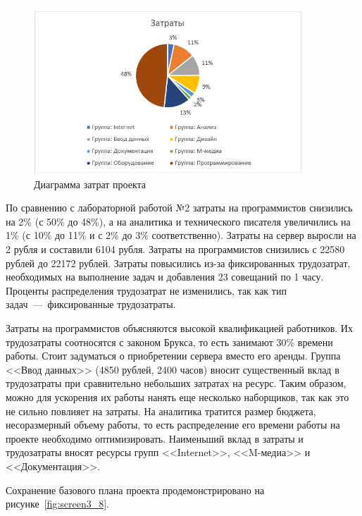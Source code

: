 \begin{figure}[H]
	\centering
	\includegraphics[width=0.9\textwidth]{img/task3/screen6.jpg}
	\caption{Диаграмма затрат проекта}
	\label{fig:screen3_6}
\end{figure}

По сравнению с лабораторной работой №2 затраты на программистов снизились на 2\% (с 50\% до 48\%), а на аналитика и технического писателя увеличились на 1\% (с 10\% до 11\% и с 2\% до 3\% соответственно).
Затраты на сервер выросли на 2 рубля и составили 6104 рубля.
Затраты на программистов снизились с 22580 рублей до 22172 рублей.
Затраты повысились из-за фиксированных трудозатрат, необходимых на выполнение задач и добавления 23 совещаний по 1 часу.
Проценты распределения трудозатрат не изменились, так как тип задач~---~фиксированные трудозатраты.

Затраты на программистов объясняются высокой квалификацией работников.
Их трудозатраты соотносятся с законом Брукса, то есть занимают 30\% времени работы.
Стоит задуматься о приобретении сервера вместо его аренды.
Группа <<Ввод данных>> (4850 рублей, 2400 часов) вносит существенный вклад в трудозатраты при сравнительно небольших затратах на ресурс.
Таким образом, можно для ускорения их работы нанять еще несколько наборщиков, так как это не сильно повлияет на затраты.
На аналитика тратится размер бюджета, несоразмерный объему работы, то есть распределение его времени работы на проекте необходимо оптимизировать.
Наименьший вклад в затраты и трудозатраты вносят ресурсы групп <<Internet>>, <<M-медиа>> и <<Документация>>.

Сохранение базового плана проекта продемонстрировано на рисунке~\ref{fig:screen3_8}.

